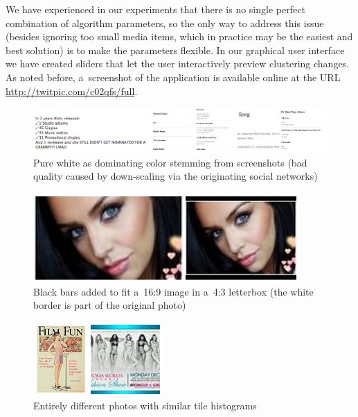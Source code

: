 We have experienced in our experiments that there is no single perfect
combination of algorithm parameters,
so the only way to address this issue (besides ignoring too small media items,
which in practice may be the easiest and best solution)
is to make the parameters flexible.
In our graphical user interface we have created sliders
that let the user interactively preview clustering changes.
As noted before, a~screenshot of the application
is available online at the URL \url{http://twitpic.com/c02qfs/full}.

\begin{figure}[!ht]
  \centering
  \includegraphics[width=1\linewidth]{./white.png}
  \caption[Pure white as dominating color stemming from screenshots]
    {Pure white as dominating color stemming from screenshots
    (bad quality caused by down-scaling via the originating social networks)}
  \label{fig:white}
\end{figure}

\begin{figure}[!ht]
  \centering
  \includegraphics[width=0.55\linewidth]{./bwtolerance.png}
  \caption[Black bars added to fit a~16:9 image in a~4:3 letterbox]
    {Black bars added to fit a~16:9 image in a~4:3 letterbox
    (the white border is part of the original photo)}
  \label{fig:bwtolerance}
\end{figure}

\begin{figure}[!ht]
  \centering
  \includegraphics[width=0.4\linewidth]{./weakness.png}
  \caption{Entirely different photos with similar tile histograms}
  \label{fig:weakness}
\end{figure}


